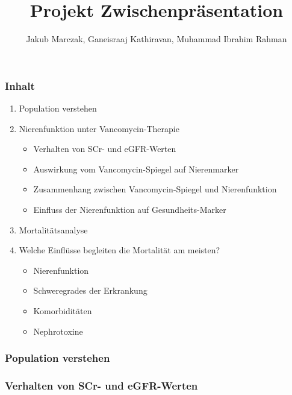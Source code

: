 \documentclass[10pt, aspectratio=169]{beamer}
\title{Projekt \MakeUppercase{\romannumeral 4}  Zwischenpräsentation}
\author[J. Marczak, G. Kathiravan, M. I. Rahman]{Jakub Marczak, Ganeisraaj Kathiravan, Muhammad Ibrahim Rahman}
\begin{document}
\begin{frame}[plain]
  \titlepage
\end{frame}

\begin{frame}
    \frametitle{Inhalt}
    \begin{enumerate}
        \item Population verstehen
        \item Nierenfunktion unter Vancomycin-Therapie
        \begin{itemize} 
        \item[$\rightarrow$] Verhalten von SCr- und eGFR-Werten
        \item[$\rightarrow$] Auswirkung vom Vancomycin-Spiegel auf Nierenmarker
        \item[$\rightarrow$] Zusammenhang zwischen Vancomycin-Spiegel und Nierenfunktion
        \item[$\rightarrow$] Einfluss der Nierenfunktion auf Gesundheits-Marker
      \end{itemize}
        \item Mortalitätsanalyse
        \item[$\rightarrow$] Welche Einflüsse begleiten die Mortalität am meisten?
        \begin{itemize}
            \item Nierenfunktion
            \item Schweregrades der Erkrankung
            \item Komorbiditäten
            \item Nephrotoxine
        \end{itemize}
    \end{enumerate}
\end{frame}

\begin{frame}
    \frametitle{Population verstehen}
\end{frame}

\begin{frame}
    \frametitle{Verhalten von SCr- und eGFR-Werten}
\end{frame}
\end{document}
